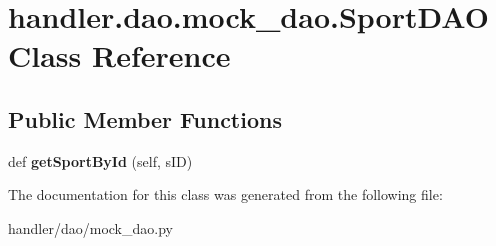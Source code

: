 \hypertarget{classhandler_1_1dao_1_1mock__dao_1_1_sport_d_a_o}{}\section{handler.\+dao.\+mock\+\_\+dao.\+Sport\+D\+AO Class Reference}
\label{classhandler_1_1dao_1_1mock__dao_1_1_sport_d_a_o}
\subsection*{Public Member Functions}
\begin{DoxyCompactItemize}
\item 
\mbox{\label{classhandler_1_1dao_1_1mock__dao_1_1_sport_d_a_o_a3fd6d85de36e1e3c9b587f6ff1644b17}} 
def {\bfseries get\+Sport\+By\+Id} (self, s\+ID)
\end{DoxyCompactItemize}


The documentation for this class was generated from the following file\+:\begin{DoxyCompactItemize}
\item 
handler/dao/mock\+\_\+dao.\+py\end{DoxyCompactItemize}
